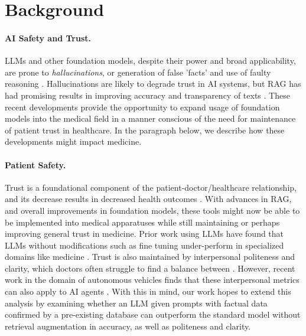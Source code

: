 \documentclass{article}
\begin{document}
\section{Background}
\paragraph{AI Safety and Trust.} LLMs and other foundation models, despite their power and broad applicability, are prone to \emph{hallucinations}, or generation of false 'facts' and use of faulty reasoning \citep{openai2023gpt4, li2023trac, chen2023benchmarking}. Hallucinations are likely to degrade trust in AI systems, but RAG has had promising results in improving accuracy and transparency of texts \citep{li2023trac, lewis2021retrievalaugmented,chen2023benchmarking}. These recent developments provide the opportunity to expand usage of foundation models into the medical field in a manner conscious of the need for maintenance of patient trust in healthcare. In the paragraph below, we describe how these developments might impact medicine.
\paragraph{Patient Safety.} Trust is a foundational component of the patient-doctor/healthcare relationship, and its decrease results in decreased health outcomes \citep{birkhauer2017trust,pearson2000patients}. With advances in RAG, and overall improvements in foundation models, these tools might now be able to be implemented into medical apparatuses while still maintaining or perhaps improving general trust in medicine. Prior work using LLMs have found that LLMs without modifications such as fine tuning under-perform in specialized domains like medicine \citep{Gutierrez2022ThinkingAG}. Trust is also maintained by interpersonal politeness and clarity, which doctors often struggle to find a balance between \citep{aronsson1987politeness}. However, recent work in the domain of autonomous vehicles finds that these interpersonal metrics can also apply to AI agents \citep{Lee2022polite}. With this in mind, our work hopes to extend this analysis by examining whether an LLM given prompts with factual data confirmed by a pre-existing database can outperform the standard model without retrieval augmentation in accuracy, as well as politeness and clarity.
\end{document}
